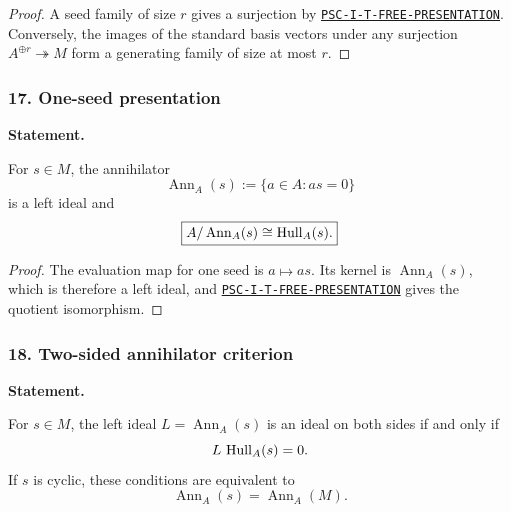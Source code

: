 \begin{proof}
A seed family of size $r$ gives a surjection by \hyperref[rec:PSC-I-T-FREE-PRESENTATION]{\nolinkurl{PSC-I-T-FREE-PRESENTATION}}.  Conversely, the images of the standard basis vectors under any surjection $A^{\oplus r}\twoheadrightarrow M$ form a generating family of size at most $r$.
\end{proof}
\subsubsection*{17. One-seed presentation}
\label{rec:PSC-I-C-ONE-SEED-PRESENTATION}
\textbf{Statement.}\par
For $s\in M$, the annihilator
\[
\operatorname{Ann}_A(s):=\{a\in A:as=0\}
\]
is a left ideal and
\[
\boxed{A/\operatorname{Ann}_A(s)\cong\Hull_A(s).}
\]

\begin{proof}
The evaluation map for one seed is $a\mapsto as$.  Its kernel is $\operatorname{Ann}_A(s)$, which is therefore a left ideal, and \hyperref[rec:PSC-I-T-FREE-PRESENTATION]{\nolinkurl{PSC-I-T-FREE-PRESENTATION}} gives the quotient isomorphism.
\end{proof}
\subsubsection*{18. Two-sided annihilator criterion}
\label{rec:PSC-I-P-ANNIHILATOR-TWO-SIDED}
\textbf{Statement.}\par
For $s\in M$, the left ideal $L=\operatorname{Ann}_A(s)$ is an ideal on both sides if and only if
\[
L\,\Hull_A(s)=0.
\]
If $s$ is cyclic, these conditions are equivalent to
\[
\operatorname{Ann}_A(s)=\operatorname{Ann}_A(M).
\]


